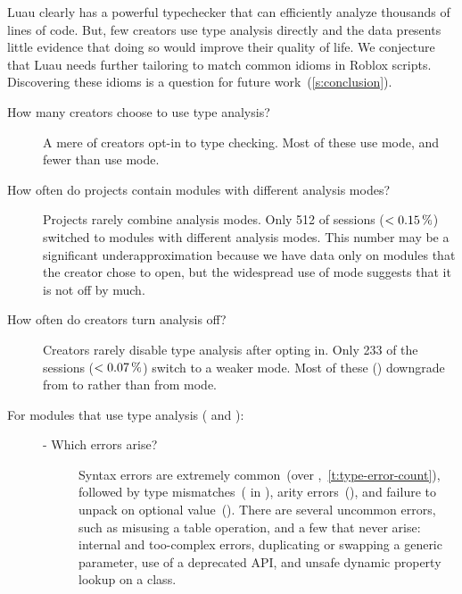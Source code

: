 \documentclass[english,submission,cleveref]{programming}
\begin{document}
Luau clearly has a powerful typechecker that can efficiently
analyze thousands of lines of code.
But, few creators use type analysis directly and the data presents little
evidence that doing so would improve their quality of life.
We conjecture that Luau needs further tailoring to match
common idioms in Roblox scripts.
Discovering these idioms is a question for future work~(\cref{s:conclusion}).

\begin{description}
  \item[How many creators choose to use type analysis?]
    A mere  of creators opt-in to type checking.
    Most of these use \mnonstrict{} mode, and fewer than 
    use \mstrict{} mode.

  \item[How often do projects contain modules with different analysis modes?]
    Projects rarely combine analysis modes.
    Only 512 of  sessions ($<\SI{0.15}{\percent}$) switched to modules with different
    analysis modes.
    This number may be a significant underapproximation because we have data
    only on modules that the creator chose to open, but the widespread use
    of \mnocheck{} mode suggests that it is not off by much.

  \item[How often do creators turn analysis off?]
    Creators rarely disable type analysis after opting in.
    Only 233 of the  sessions ($<\SI{0.07}{\percent}$)
    switch to a weaker mode.
    Most of these () downgrade from \mstrict{} to
    \mnonstrict{} %
    rather than from \mnonstrict{} mode.



  \item[For modules that use type analysis (\mstrict{} and \mnonstrict{}):]\leavevmode
    \begin{description}
      \item[- Which errors arise?]
        Syntax errors are extremely common~(over ,~\cref{t:type-error-count}), 
        followed by type mismatches~( in \mstrict{}),
        arity errors~(),
        and failure to unpack on optional value~().
        There are several uncommon errors, such as misusing a table operation,
        and a few that never arise: internal and too-complex errors,
        duplicating or swapping a generic parameter, use of a deprecated API,
        and unsafe dynamic property lookup on a class.


\end{description}
\end{description}
\end{document}
